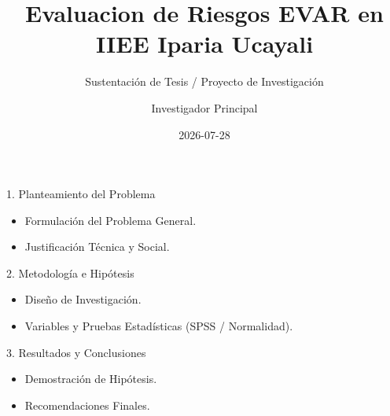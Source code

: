 \documentclass{beamer}
\title{Evaluacion de Riesgos EVAR en IIEE Iparia Ucayali}
\subtitle{Sustentación de Tesis / Proyecto de Investigación}
\author{Investigador Principal}
\date{2026-07-28}
\begin{document}
\frame{\titlepage}

\begin{frame}{1. Planteamiento del Problema}
\begin{itemize}
    \item Formulación del Problema General.
    \item Justificación Técnica y Social.
\end{itemize}
\end{frame}

\begin{frame}{2. Metodología e Hipótesis}
\begin{itemize}
    \item Diseño de Investigación.
    \item Variables y Pruebas Estadísticas (SPSS / Normalidad).
\end{itemize}
\end{frame}

\begin{frame}{3. Resultados y Conclusiones}
\begin{itemize}
    \item Demostración de Hipótesis.
    \item Recomendaciones Finales.
\end{itemize}
\end{frame}
\end{document}

